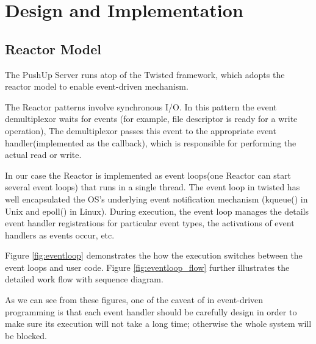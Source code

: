 \section {Design and Implementation\\}

\subsection{Reactor Model\\}
The PushUp Server runs atop of the Twisted framework\cite{Twisted}, which 
adopts the reactor model\cite{Reactor} to enable event-driven mechanism. 

The Reactor patterns involve synchronous I/O. In this pattern the event 
demultiplexor waits for events (for example, file descriptor is 
ready for a write operation), The demultiplexor passes this event to the
appropriate event handler(implemented as the callback), which is 
responsible for performing the actual read or write.

In our case the Reactor is implemented as event loops(one Reactor 
can start several event loops) that runs in a single thread. The
event loop in twisted has well encapsulated the OS's underlying 
event notification mechanism (kqueue() in Unix and epoll() in Linux).
During execution, the event loop manages the details event handler 
registrations for particular event types, the activations of event 
handlers as events occur, etc.

Figure \ref{fig:eventloop} demonstrates the how the execution switches
between the event loops and user code. Figure \ref{fig:eventloop_flow} 
further illustrates the detailed work flow with sequence diagram.

As we can see from these figures, one of the caveat of in 
event-driven programming is that each event handler should 
be carefully design in order to make sure its execution 
will not take a long time; otherwise the whole system will 
be blocked.

